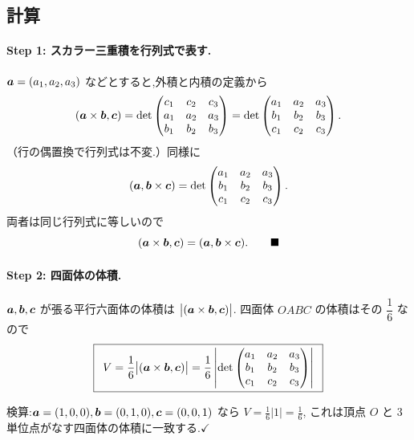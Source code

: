 \documentclass[11pt,a4paper]{article}
\begin{document}
\subsection*{計算}

\paragraph{Step 1: スカラー三重積を行列式で表す.}
$\bm{a}=(a_1,a_2,a_3)$ などとすると,外積と内積の定義から
\[
(\bm{a}\times\bm{b},\bm{c})=\det\begin{pmatrix}c_1&c_2&c_3\\a_1&a_2&a_3\\b_1&b_2&b_3\end{pmatrix}
=\det\begin{pmatrix}a_1&a_2&a_3\\b_1&b_2&b_3\\c_1&c_2&c_3\end{pmatrix}.
\]
（行の偶置換で行列式は不変.）同様に
\[
(\bm{a},\bm{b}\times\bm{c})=\det\begin{pmatrix}a_1&a_2&a_3\\b_1&b_2&b_3\\c_1&c_2&c_3\end{pmatrix}.
\]
両者は同じ行列式に等しいので
\[
(\bm{a}\times\bm{b},\bm{c})=(\bm{a},\bm{b}\times\bm{c}).\qquad\blacksquare
\]

\paragraph{Step 2: 四面体の体積.}
$\bm{a},\bm{b},\bm{c}$ が張る平行六面体の体積は $\bigl|(\bm{a}\times\bm{b},\bm{c})\bigr|$.
四面体 $OABC$ の体積はその $\dfrac16$ なので
\[
\ans{\
V=\frac16\bigl|(\va\times\vb,\bm{c})\bigr|
=\frac16\left|\det\begin{pmatrix}a_1&a_2&a_3\\b_1&b_2&b_3\\c_1&c_2&c_3\end{pmatrix}\right|\ }
\]

検算:$\bm{a}=(1,0,0),\bm{b}=(0,1,0),\bm{c}=(0,0,1)$ なら $V=\frac16|1|=\frac16$,
これは頂点 $O$ と $3$ 単位点がなす四面体の体積に一致する.$\checkmark$
\end{document}
